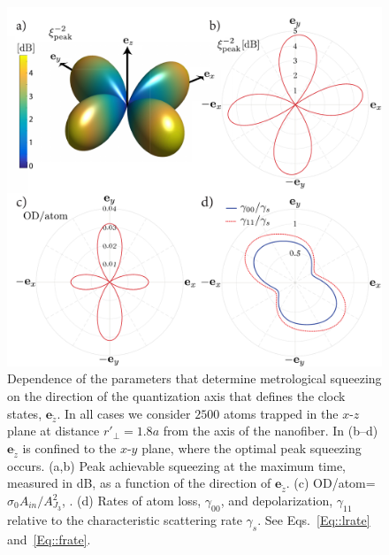 \documentclass[preprint, aps,pra,onecolumn]{revtex4-1} %
\newcommand{\qaxis}{\mathbf{e}_{\tilde{z}}}
\begin{document}
\begin{figure}
\includegraphics[scale=0.37]{./Fig5}
\caption{Dependence of the parameters that determine metrological squeezing  on the direction of the quantization axis that defines the clock states, $\qaxis$.  In all cases we consider $2500$ atoms trapped in the $x$-$z$ plane at distance $ r'\!_\perp=1.8a$ from the axis of the nanofiber. 
In (b--d) $\qaxis$ is confined to the $x$-$y$ plane, where the optimal peak squeezing occurs.
(a,b)  Peak achievable squeezing at the maximum time, measured in dB, as a function of the direction of  $\qaxis$. 
(c) OD/atom=$\sigma_0 A_{in}/A^2_{J_3}$, .
(d) Rates of atom loss, $\gamma_{00}$, and depolarization, $\gamma_{11}$ relative to the characteristic scattering rate $\gamma_s$.  See Eqs.~\eqref{Eq::lrate} and~\eqref{Eq::frate}. }\label{Fig::Squeezing_QuantizationAxis}
\end{figure}
\end{document}
